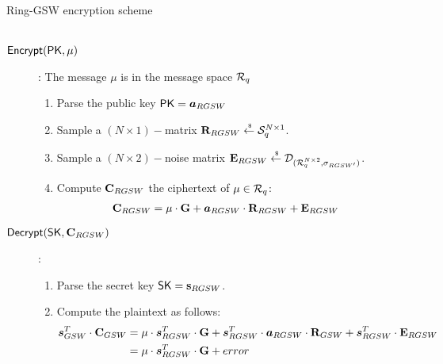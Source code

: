 \begin{subsection}{Ring-GSW encryption scheme~\cite{DBLP:journals/tc/KhedrGV16}}
\begin{description}
\begin{enumerate}
\begin{align*}
      \end{align*}
    \end{enumerate}
  \item[${\mathsf{Encrypt}}(\mathsf{PK}, \mu)$]: The message $\mu$ is in the message space ${\mathcal{R}}_q$
    \begin{enumerate}
    \item Parse the public key $\PK = \vec{a}_{RGSW}$
    \item Sample a $(N \times 1)-$matrix $\mathbf{R}_{RGSW} \stackrel{{\scriptscriptstyle \mkern4mu \$}}{\gets} \mathcal{S}_q^{N \times 1}$.
    \item Sample a $(N \times 2)-$noise matrix $\mathbf{E}_{RGSW} \stackrel{{\scriptscriptstyle \mkern4mu \$}}{\gets} \mathcal{D}_{({\mathcal{R}}_q^{N \times 2}, \sigma_{RGSW'})}$.
    \item Compute $\mathbf{C}_{RGSW}$ the ciphertext of $\mu \in {\mathcal{R}}_q$:
      \begin{align*}
        \mat{C}_{RGSW} &= \mu \cdot \mat{G} + \vec{a}_{RGSW} \cdot \mat{R}_{RGSW} + \mat{E}_{RGSW}
      \end{align*}
    \end{enumerate}
  \item[${\mathsf{Decrypt}}(\mathsf{SK}, \mathbf{C}_{RGSW})$]:
    \begin{enumerate}
    \item Parse the secret key $\mathsf{SK} = \mathbf{s}_{RGSW}$.
    \item Compute the plaintext as follows:
      \begin{align*}
        \vec{s}_{GSW}^T \cdot \mat{C}_{GSW} &= \mu \cdot \vec{s}_{RGSW}^T \cdot \mat{G} + \vec{s}_{RGSW}^T \cdot \vec{a}_{RGSW} \cdot \mat{R}_{GSW} + \vec{s}_{RGSW}^T \cdot \mat{E}_{RGSW}\\
        &= \mu \cdot \vec{s}_{RGSW}^T \cdot \mat{G} + error
      \end{align*}
    
    \end{enumerate}
  \end{description}
  
\end{subsection}

